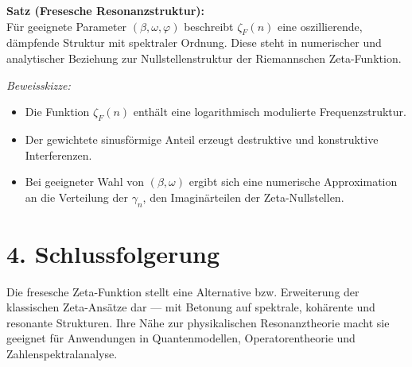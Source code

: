 \documentclass[11pt]{article}
\begin{document}
\textbf{Satz (Fresesche Resonanzstruktur):} \\
Für geeignete Parameter \((\beta, \omega, \varphi)\) beschreibt \(\zeta_F(n)\) eine oszillierende, dämpfende Struktur mit spektraler Ordnung. Diese steht in numerischer und analytischer Beziehung zur Nullstellenstruktur der Riemannschen Zeta-Funktion.

\textit{Beweisskizze:}
\begin{itemize}
    \item Die Funktion \(\zeta_F(n)\) enthält eine logarithmisch modulierte Frequenzstruktur.
    \item Der gewichtete sinusförmige Anteil erzeugt destruktive und konstruktive Interferenzen.
    \item Bei geeigneter Wahl von \((\beta, \omega)\) ergibt sich eine numerische Approximation an die Verteilung der \(\gamma_n\), den Imaginärteilen der Zeta-Nullstellen.
\end{itemize}

\section*{4. Schlussfolgerung}

Die fresesche Zeta-Funktion stellt eine Alternative bzw. Erweiterung der klassischen Zeta-Ansätze dar — mit Betonung auf spektrale, kohärente und resonante Strukturen. Ihre Nähe zur physikalischen Resonanztheorie macht sie geeignet für Anwendungen in Quantenmodellen, Operatorentheorie und Zahlenspektralanalyse.
\end{document}
